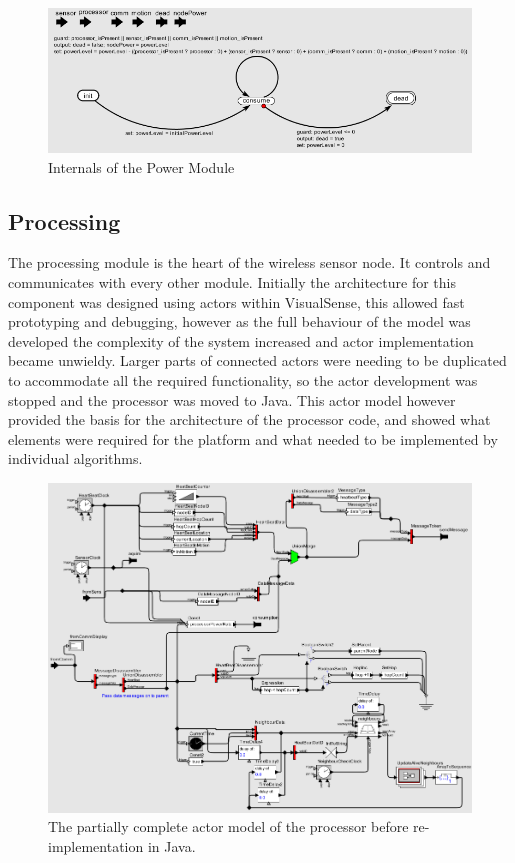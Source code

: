 \documentclass[authoryearcitations]{UoYCSproject}
\begin{document}
\begin{figure}
 \centering
    \includegraphics[width=\textwidth]{figures/powerInternals.png}
    \caption{Internals of the Power Module}
    \label{fig:powerInternals}
\end{figure}

\subsection{Processing}

The processing module is the heart of the wireless sensor node. It controls and communicates with every other module. Initially the architecture for this component was designed using actors within VisualSense, this allowed fast prototyping and debugging, however as the full behaviour of the model was developed the complexity of the system increased and actor implementation became unwieldy. Larger parts of connected actors were needing to be duplicated to accommodate all the required functionality, so the actor development was stopped and the processor was moved to Java. This actor model however provided the basis for the architecture of the processor code, and showed what elements were required for the platform and what needed to be implemented by individual algorithms.

\begin{figure}
 \centering
    \includegraphics[width=\textwidth]{figures/processorInternals.png}
    \caption{The partially complete actor model of the processor before re-implementation in Java.}
    \label{fig:processorInternals}
\end{figure}
\end{document}
